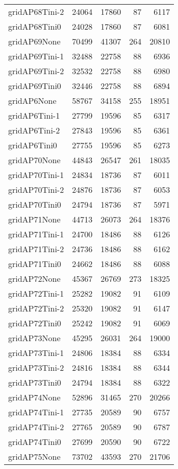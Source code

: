 \begin{longtable}{lrrrr}
gridAP68Tini-2 & 24064 & 17860 & 87 & 6117 \\
gridAP68Tini0 & 24028 & 17860 & 87 & 6081 \\
gridAP69None & 70499 & 41307 & 264 & 20810 \\
gridAP69Tini-1 & 32488 & 22758 & 88 & 6936 \\
gridAP69Tini-2 & 32532 & 22758 & 88 & 6980 \\
gridAP69Tini0 & 32446 & 22758 & 88 & 6894 \\
gridAP6None & 58767 & 34158 & 255 & 18951 \\
gridAP6Tini-1 & 27799 & 19596 & 85 & 6317 \\
gridAP6Tini-2 & 27843 & 19596 & 85 & 6361 \\
gridAP6Tini0 & 27755 & 19596 & 85 & 6273 \\
gridAP70None & 44843 & 26547 & 261 & 18035 \\
gridAP70Tini-1 & 24834 & 18736 & 87 & 6011 \\
gridAP70Tini-2 & 24876 & 18736 & 87 & 6053 \\
gridAP70Tini0 & 24794 & 18736 & 87 & 5971 \\
gridAP71None & 44713 & 26073 & 264 & 18376 \\
gridAP71Tini-1 & 24700 & 18486 & 88 & 6126 \\
gridAP71Tini-2 & 24736 & 18486 & 88 & 6162 \\
gridAP71Tini0 & 24662 & 18486 & 88 & 6088 \\
gridAP72None & 45367 & 26769 & 273 & 18325 \\
gridAP72Tini-1 & 25282 & 19082 & 91 & 6109 \\
gridAP72Tini-2 & 25320 & 19082 & 91 & 6147 \\
gridAP72Tini0 & 25242 & 19082 & 91 & 6069 \\
gridAP73None & 45295 & 26031 & 264 & 19000 \\
gridAP73Tini-1 & 24806 & 18384 & 88 & 6334 \\
gridAP73Tini-2 & 24816 & 18384 & 88 & 6344 \\
gridAP73Tini0 & 24794 & 18384 & 88 & 6322 \\
gridAP74None & 52896 & 31465 & 270 & 20266 \\
gridAP74Tini-1 & 27735 & 20589 & 90 & 6757 \\
gridAP74Tini-2 & 27765 & 20589 & 90 & 6787 \\
gridAP74Tini0 & 27699 & 20590 & 90 & 6722 \\
gridAP75None & 73702 & 43593 & 270 & 21706 \\

\end{longtable}

